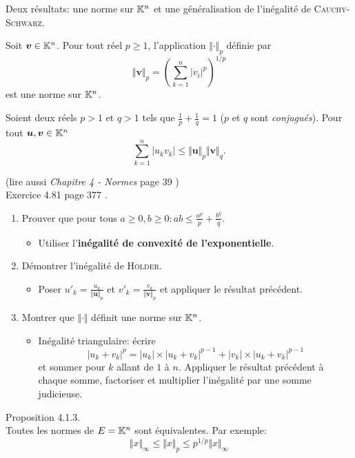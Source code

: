 Deux résultats: une norme sur $\mathbb{K}^n$ et une généralisation de l'inégalité de \textsc{Cauchy}-\textsc{Schwarz}. 
\begin{defi}
    Soit $\bm{v} \in \mathbb{K}^n$. Pour tout réel $p \geqslant 1$, l'application $\Vert \bm{\cdot} \Vert_p$ définie par
    $$\Vert \bm{v} \Vert_p = \left (\sum_{k=1}^{n} |v_i|^p \right)^{1/p}$$
    est une norme sur $\mathbb{K}^n$.
\end{defi}

\begin{prop}
    Soient deux réels $p > 1$ et $q > 1$ tels que $\frac{1}{p} + \frac{1}{q} = 1$ ($p$ et $q$ sont \emph{conjugués}). Pour tout $\bm{u}, \bm{v} \in \mathbb{K}^n$
    $$\sum_{k=1}^{n} |u_k v_k| \leqslant \Vert \bm{u} \Vert_p \Vert \bm{v} \Vert_q.$$
\end{prop}

\begin{preuve}(lire aussi \emph{Chapitre 4 - Normes} page 39 \cite{matrices}) \\
    Exercice 4.81 page 377 \cite{oraux_x_ens_3}.
    \begin{enumerate}
        \item Prouver que pour tous $a \geqslant 0, b \geqslant 0: ab \leqslant \frac{a^p}{p} + \frac{b^q}{q}$.
        \begin{itemize}
            \item Utiliser l'\textbf{inégalité de convexité de l'exponentielle}.
        \end{itemize}
        \item Démontrer l'inégalité de \textsc{Hölder}.
        \begin{itemize}
            \item Poser $u'_k = \frac{u_k}{\Vert \bm{u} \Vert_p}$ et $v'_k = \frac{v_k}{\Vert \bm{v} \Vert_p}$ et appliquer le résultat précédent. 
        \end{itemize}
        \item Montrer que $\Vert \bm{\cdot} \Vert$ définit une norme sur $\mathbb{K}^n$.
        \begin{itemize}
            \item Inégalité triangulaire: écrire 
            $$|u_k + v_k|^p = |u_k| \times |u_k + v_k|^{p-1} + |v_k| \times |u_k + v_k|^{p-1}$$ 
            et sommer pour $k$ allant de $1$ à $n$. Appliquer le résultat précédent à chaque somme, factoriser et multiplier l'inégalité par une somme judicieuse. 
        \end{itemize}
    \end{enumerate}
\end{preuve}     

\begin{prop}
    Proposition 4.1.3. \cite{matrices} \\
    Toutes les normes de $E = \mathbb{K}^n$ sont équivalentes. Par exemple:
    $$\Vert x \Vert_\infty \leqslant \Vert x \Vert_p \leqslant p^{1/p} \Vert x \Vert_\infty$$
\end{prop}
